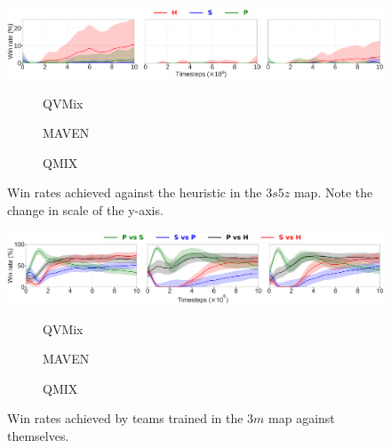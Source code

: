 \begin{subfigure}{\textwidth}
    \centering
    \includegraphics[width=.9\textwidth]{tex_thesis/figures/ch7/3s5z_tiny_heuristic_plot_qvmixmavenqmix.pdf}
    \begin{subfigure}{.05\textwidth}
    \centering
    \caption*{}
    \end{subfigure}%
    \begin{subfigure}{.31\textwidth}
    \renewcommand\thesubfigure{\alph{subfigure}.1}
      \centering
      \caption{QVMix}
      \label{subfig:3s5z_vs_h_methodQVMIX}
    \end{subfigure}%
    \begin{subfigure}{.31\textwidth}
    \addtocounter{subfigure}{-1}
    \renewcommand\thesubfigure{\alph{subfigure}.2}
      \centering
      \caption{MAVEN}
      \label{subfig:3s5z_vs_h_methodMAVEN}
    \end{subfigure}%
    \begin{subfigure}{.31\textwidth}
    \addtocounter{subfigure}{-1}
    \renewcommand\thesubfigure{\alph{subfigure}.3}
      \centering
      \caption{QMIX}
      \label{subfig:3s5z_vs_h_methodQMIX}
    \end{subfigure}
\addtocounter{subfigure}{-1}
\caption{Win rates achieved against the heuristic in the $3s5z$ map. Note the change in scale of the y-axis.}
\label{subfig:3s5z_vsh}
\end{subfigure}
\begin{subfigure}{\textwidth}
\centering
    \includegraphics[width=.9\textwidth]{tex_thesis/figures/ch7/tiny_perf_self_popu.pdf}
    \begin{subfigure}{.05\textwidth}
    \centering
    \caption*{}
    \end{subfigure}%
    \begin{subfigure}{.31\textwidth}
    \renewcommand\thesubfigure{\alph{subfigure}.1}
      \centering
      \caption{QVMix}
      \label{subfig:duo_methodQVMIX}
    \end{subfigure}%
    \begin{subfigure}{.31\textwidth}
    \addtocounter{subfigure}{-1}
    \renewcommand\thesubfigure{\alph{subfigure}.2}
      \centering
      \caption{MAVEN}
      \label{subfig:duo_methodMAVEN}
    \end{subfigure}%
    \begin{subfigure}{.31\textwidth}
    \addtocounter{subfigure}{-1}
    \renewcommand\thesubfigure{\alph{subfigure}.3}
      \centering
      \caption{QMIX}
      \label{subfig:duo_methodQMIX}
    \end{subfigure}
\addtocounter{subfigure}{-1}
\caption{Win rates achieved by teams trained in the $3m$ map against themselves.}
\label{subfig:3m_duo}
\end{subfigure}

